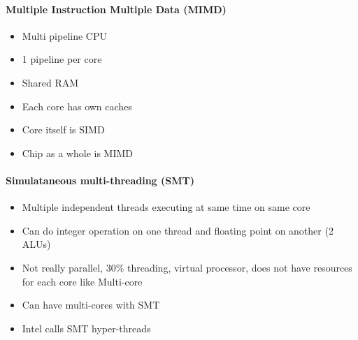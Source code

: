 \documentclass[12 pt]{article}
\begin{document}
\paragraph{Multiple Instruction Multiple Data (MIMD)}
\begin{itemize}
\item Multi pipeline CPU
\item 1 pipeline per core
\item Shared RAM
\item Each core has own caches
\item Core itself is SIMD
\item Chip as a whole is MIMD
\end{itemize}
\paragraph{Simulataneous multi-threading (SMT)}
\begin{itemize}
\item Multiple independent threads executing at same time on same core
\item Can do integer operation on one thread and floating point on another (2 ALUs)
\item Not really parallel, $30\%$ threading, virtual processor, does not have resources for each core like Multi-core
\item Can have multi-cores with SMT
\item Intel calls SMT hyper-threads
\end{itemize}
\end{document}
